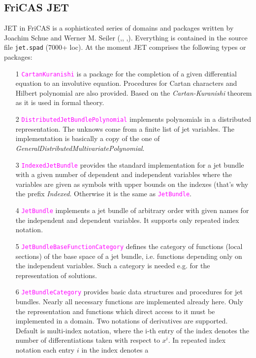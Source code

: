 \documentclass[12pt,a4paper]{article}
\newcommand{\spadfun}[1]{\textcolor{magenta}{\tt #1}}
\begin{document}
\subsection{FriCAS JET} 
JET in FriCAS is a sophisticated series of domains and packages written
by Joachim Schue and Werner M. Seiler (\cite{wms:aci},\cite{wms:axiom},
\cite{wms:diss},\cite{wms:jet}). Everything is contained in the
source file {\tt jet.spad} ($7000$+ loc). At the moment JET comprises
the following types or packages:
\begin{itemize}
\item[1] \spadfun{CartanKuranishi} is a package for the completion of a 
given differential equation to an involutive equation. Procedures for 
Cartan characters and Hilbert polynomial are also provided. Based on the 
{\em Cartan-Kuranishi} theorem as it is used in formal theory.
%
\item[2] \spadfun{DistributedJetBundlePolynomial} implements polynomials 
in a distributed representation. The unknows come from a finite list of 
jet variables. The implementation is basically a copy of the one of 
{\em GeneralDistributedMultivariatePolynomial}. 
%
\item[3] \spadfun{IndexedJetBundle} provides the standard implementation 
for a jet bundle with a given number of dependent and independent 
variables where the variables are given as symbols with upper bounds 
on the indexes (that's why the prefix {\it Indexed}. Otherwise it is
the same as \spadfun{JetBundle}.
%
\item[4] \spadfun{JetBundle} implements a jet bundle of arbitrary order 
with given names for the independent and dependent variables. 
It supports only repeated index notation.
%
\item[5] \spadfun{JetBundleBaseFunctionCategory} defines the category of 
functions (local sections) of the base space of a jet bundle, i.e. 
functions depending only on the independent variables. Such a category 
is needed e.g. for the representation of solutions.
%
\item[6] \spadfun{JetBundleCategory} provides basic data structures and 
procedures for jet bundles. Nearly all necessary functions are implemented 
already here. Only the representation and functions which direct access 
to it must be implemented in a domain. Two notations of derivatives are 
supported. Default is multi-index notation, where the i-th entry of the 
index denotes the number of differentiations taken with respect to $x^i$. 
In repeated index notation each entry $i$ in the index denotes a 

\end{itemize}
\end{document}
